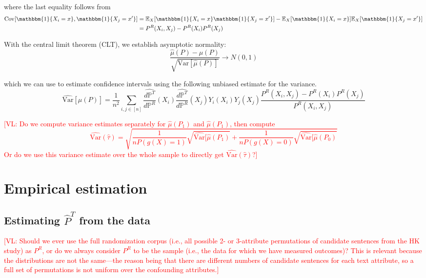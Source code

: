 \documentclass{article}
\newcommand{\vl}[1]{\textcolor{red}{[VL: #1]}}
\begin{document}
	where the last equality follows from
	\begin{align*}
		\text{Cov}[\mathbbm{1}\{X_i=x\},\mathbbm{1}\{X_j=x'\}] &=\mathbb{E}_X[\mathbbm{1}\{X_i=x\}\mathbbm{1}\{X_j=x'\}] - \mathbb{E}_X[\mathbbm{1}\{X_i=x\}]\mathbb{E}_X[\mathbbm{1}\{X_j=x'\}] \\
		&= P^R(X_i,X_j) - P^R(X_i)P^R(X_j)
	\end{align*}
	
	With the central limit theorem (CLT), we establish asymptotic normality:
	\begin{equation*}
		\frac{\hat{\mu}(P) - \mu(P)}{\sqrt{\text{Var}[\hat{\mu}(P)]}}\rightarrow N(0,1)
	\end{equation*}
	
	which we can use to estimate confidence intervals using the following unbiased estimate for the variance.
	\begin{equation*}
		\widehat{\text{Var}}[\hat{\mu}(P)] = \frac{1}{n^2} \sum_{i,j \in [n]} \frac{\hat{d \mathbb{P}^T}}{d \mathbb{P}^R}(X_i)\frac{\hat{d \mathbb{P}^T}}{d \mathbb{P}^R}(X_j)Y_i(X_i)Y_j(X_j)\frac{P^R(X_i,X_j) - P^R(X_i)P^R(X_j)}{P^R(X_i,X_j)}
	\end{equation*}
	
	\vl{Do we compute variance estimates separately for $\hat{\mu}(P_1)$ and $\hat{\mu}(P_1)$, then compute $$\widehat{\text{Var}}(\hat{\tau})=\sqrt{\frac{1}{nP(g(X)=1)}\sqrt{\widehat{\text{Var}}[\hat{\mu}(P_1)} + \frac{1}{nP(g(X)=0)}\sqrt{\widehat{\text{Var}}[\hat{\mu}(P_0)}}$$ Or do we use this variance estimate over the whole sample to directly get $\widehat{\text{Var}}(\hat{\tau})$?}
	
	\section{Empirical estimation}
	\subsection{Estimating $\hat{P}^T$ from the data}
	
	\vl{Should we ever use the full randomization corpus (i.e., all possible 2- or 3-attribute permutations of candidate sentences from the HK study) as $P^R$, or do we always consider $P^R$ to be the sample (i.e., the data for which we have measured outcomes)? This is relevant because the distributions are not the same---the reason being that there are different numbers of candidate sentences for each text attribute, so a full set of permutations is not uniform over the confounding attributes.}
	
\end{document}
